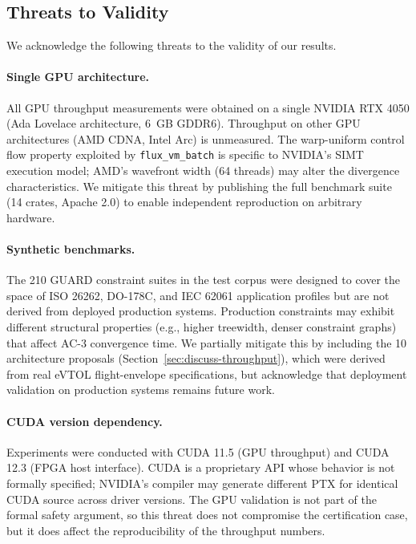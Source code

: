 \documentclass[conference]{IEEEtran}
\begin{document}
{%
\subsection{Threats to Validity}
\label{sec:discuss-threats}

We acknowledge the following threats to the validity of our results.

\paragraph{Single GPU architecture.}
All GPU throughput measurements were obtained on a single NVIDIA RTX 4050
(Ada Lovelace architecture, 6~GB GDDR6). Throughput on other GPU
architectures (AMD CDNA, Intel Arc) is unmeasured. The warp-uniform
control flow property exploited by \texttt{flux\_vm\_batch} is specific
to NVIDIA's SIMT execution model; AMD's wavefront width (64 threads)
may alter the divergence characteristics. We mitigate this threat by
publishing the full benchmark suite (14 crates, Apache 2.0) to enable
independent reproduction on arbitrary hardware.

\paragraph{Synthetic benchmarks.}
The 210 GUARD constraint suites in the test corpus were designed to cover
the space of ISO 26262, DO-178C, and IEC 62061 application profiles but
are not derived from deployed production systems. Production constraints
may exhibit different structural properties (e.g., higher treewidth,
denser constraint graphs) that affect AC-3 convergence time. We
partially mitigate this by including the 10 architecture proposals
(Section~\ref{sec:discuss-throughput}), which were derived from real
eVTOL flight-envelope specifications, but acknowledge that deployment
validation on production systems remains future work.

\paragraph{CUDA version dependency.}
Experiments were conducted with CUDA 11.5 (GPU throughput) and CUDA 12.3
(FPGA host interface). CUDA is a proprietary API whose behavior is not
formally specified; NVIDIA's compiler may generate different PTX for
identical CUDA source across driver versions. The GPU validation is not
part of the formal safety argument, so this threat does not compromise
the certification case, but it does affect the reproducibility of the
throughput numbers.

}
\end{document}

